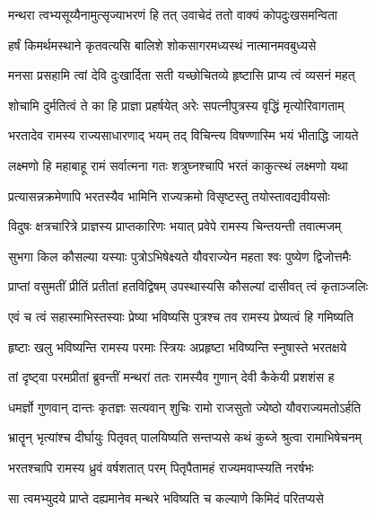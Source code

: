 
\twolineshloka
{मन्थरा त्वभ्यसूय्यैनामुत्सृज्याभरणं हि तत्}
{उवाचेदं ततो वाक्यं कोपदुःखसमन्विता} %

\twolineshloka
{हर्षं किमर्थमस्थाने कृतवत्यसि बालिशे}
{शोकसागरमध्यस्थं नात्मानमवबुध्यसे} %

\twolineshloka
{मनसा प्रसहामि त्वां देवि दुःखार्दिता सती}
{यच्छोचितव्ये हृष्टासि प्राप्य त्वं व्यसनं महत्} %

\twolineshloka
{शोचामि दुर्मतित्वं ते का हि प्राज्ञा प्रहर्षयेत्}
{अरेः सपत्नीपुत्रस्य वृद्धिं मृत्योरिवागताम्} %

\twolineshloka
{भरतादेव रामस्य राज्यसाधारणाद् भयम्}
{तद् विचिन्त्य विषण्णास्मि भयं भीताद्धि जायते} %

\twolineshloka
{लक्ष्मणो हि महाबाहू रामं सर्वात्मना गतः}
{शत्रुघ्नश्चापि भरतं काकुत्स्थं लक्ष्मणो यथा} %

\twolineshloka
{प्रत्यासन्नक्रमेणापि भरतस्यैव भामिनि}
{राज्यक्रमो विसृष्टस्तु तयोस्तावद्यवीयसोः} %

\twolineshloka
{विदुषः क्षत्रचारित्रे प्राज्ञस्य प्राप्तकारिणः}
{भयात् प्रवेपे रामस्य चिन्तयन्ती तवात्मजम्} %

\twolineshloka
{सुभगा किल कौसल्या यस्याः पुत्रोऽभिषेक्ष्यते}
{यौवराज्येन महता श्वः पुष्येण द्विजोत्तमैः} %

\twolineshloka
{प्राप्तां वसुमतीं प्रीतिं प्रतीतां हतविद्विषम्}
{उपस्थास्यसि कौसल्यां दासीवत् त्वं कृताञ्जलिः} %

\twolineshloka
{एवं च त्वं सहास्माभिस्तस्याः प्रेष्या भविष्यसि}
{पुत्रश्च तव रामस्य प्रेष्यत्वं हि गमिष्यति} %

\twolineshloka
{हृष्टाः खलु भविष्यन्ति रामस्य परमाः स्त्रियः}
{अप्रहृष्टा भविष्यन्ति स्नुषास्ते भरतक्षये} %

\twolineshloka
{तां दृष्ट्वा परमप्रीतां ब्रुवन्तीं मन्थरां ततः}
{रामस्यैव गुणान् देवी कैकेयी प्रशशंस ह} %

\twolineshloka
{धमर्ज्ञो गुणवान् दान्तः कृतज्ञः सत्यवान् शुचिः}
{रामो राजसुतो ज्येष्ठो यौवराज्यमतोऽर्हति} %

\twolineshloka
{भ्रातॄन् भृत्यांश्च दीर्घायुः पितृवत् पालयिष्यति}
{सन्तप्यसे कथं कुब्जे श्रुत्वा रामाभिषेचनम्} %

\twolineshloka
{भरतश्चापि रामस्य ध्रुवं वर्षशतात् परम्}
{पितृपैतामहं राज्यमवाप्स्यति नरर्षभः} %

\twolineshloka
{सा त्वमभ्युदये प्राप्ते दह्यमानेव मन्थरे}
{भविष्यति च कल्याणे किमिदं परितप्यसे} %

